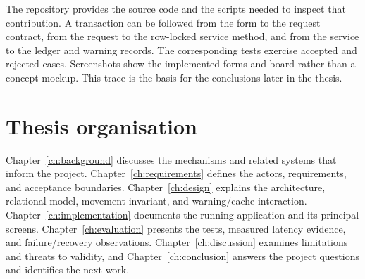 The repository provides the source code and the scripts needed to inspect that contribution. A transaction can be followed from the form to the request contract, from the request to the row-locked service method, and from the service to the ledger and warning records. The corresponding tests exercise accepted and rejected cases. Screenshots show the implemented forms and board rather than a concept mockup. This trace is the basis for the conclusions later in the thesis.

\section{Thesis organisation}
Chapter~\ref{ch:background} discusses the mechanisms and related systems that inform the project. Chapter~\ref{ch:requirements} defines the actors, requirements, and acceptance boundaries. Chapter~\ref{ch:design} explains the architecture, relational model, movement invariant, and warning/cache interaction. Chapter~\ref{ch:implementation} documents the running application and its principal screens. Chapter~\ref{ch:evaluation} presents the tests, measured latency evidence, and failure/recovery observations. Chapter~\ref{ch:discussion} examines limitations and threats to validity, and Chapter~\ref{ch:conclusion} answers the project questions and identifies the next work.
